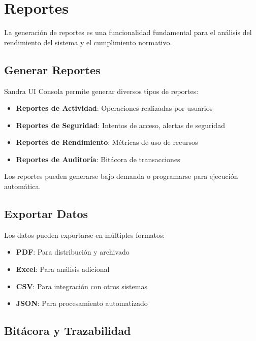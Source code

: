 
\chapter{Reportes}

La generación de reportes es una funcionalidad fundamental para el análisis del rendimiento del sistema y el cumplimiento normativo.

\section{Generar Reportes}

Sandra UI Consola permite generar diversos tipos de reportes:

\begin{itemize}
    \item \textbf{Reportes de Actividad}: Operaciones realizadas por usuarios
    \item \textbf{Reportes de Seguridad}: Intentos de acceso, alertas de seguridad
    \item \textbf{Reportes de Rendimiento}: Métricas de uso de recursos
    \item \textbf{Reportes de Auditoría}: Bitácora de transacciones
\end{itemize}

Los reportes pueden generarse bajo demanda o programarse para ejecución automática.

\section{Exportar Datos}

Los datos pueden exportarse en múltiples formatos:

\begin{itemize}
    \item \textbf{PDF}: Para distribución y archivado
    \item \textbf{Excel}: Para análisis adicional
    \item \textbf{CSV}: Para integración con otros sistemas
    \item \textbf{JSON}: Para procesamiento automatizado
\end{itemize}

\section{Bitácora y Trazabilidad}


